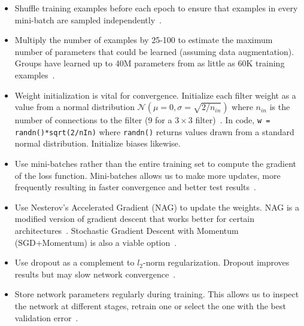 \begin{itemize}
	\item Shuffle training examples before each epoch to ensure that examples in every mini-batch are sampled independently~\cite{Bengio2012}.

	\item Multiply the number of examples by 25-100 to estimate the maximum number of parameters that could be learned (assuming data augmentation). Groups have learned up to 40M parameters from as little as 60K training examples~\cite{Dieleman2015, Springenberg2014}.

	\item Weight initialization is vital for convergence. Initialize each filter weight as a value from a normal distribution $\mathcal{N}(\mu = 0, \sigma = \sqrt{2/n_{in}})$ where $n_{in}$ is the number of connections to the filter (9 for a $3\times 3$ filter)~\cite{He2015a}. In code, \texttt{w = randn()*sqrt(2/nIn)} where \texttt{randn()} returns values drawn from a standard normal distribution. Initialize biases likewise.

	\item Use mini-batches rather than the entire training set to compute the gradient of the loss function. Mini-batches allows us to make more updates, more frequently resulting in faster convergence and better test results~\cite{Bengio2012}.

	\item Use Nesterov's Accelerated Gradient (NAG) to update the weights. NAG is a modified version of gradient descent that works better for certain architectures~\cite{Bengio2012b}. Stochastic Gradient Descent with Momentum (SGD+Momentum) is also a viable option~\cite{Karpathy2016}.

	\item Use dropout as a complement to $l_2$-norm regularization. Dropout improves results but may slow network convergence~\cite{Krizhevsky2012}.

	\item Store network parameters regularly during training. This allows us to inspect the network at different stages, retrain one or select the one with the best validation error~\cite{Bengio2014}.


\end{itemize}

